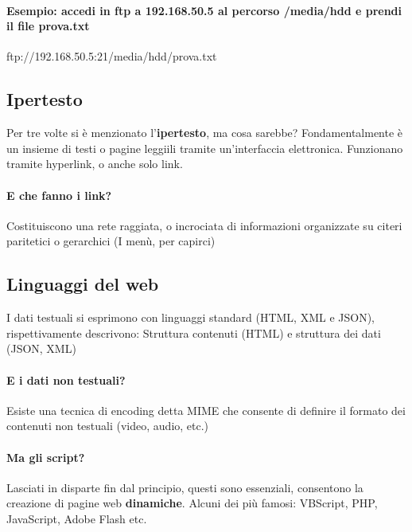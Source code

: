 \documentclass[12pt, a4paper, openany, twoside]{book}
\begin{document}
\paragraph{Esempio: accedi in ftp a 192.168.50.5 al percorso /media/hdd e 
prendi il file prova.txt} ftp://192.168.50.5:21/media/hdd/prova.txt
\subsection{Ipertesto}
Per tre volte si è menzionato l'\textbf{ipertesto}, ma cosa sarebbe? Fondamentalmente
è un insieme di testi o pagine leggiili tramite un'interfaccia elettronica. 
Funzionano tramite hyperlink, o anche solo link.
\paragraph{E che fanno i link?} Costituiscono una rete raggiata, o incrociata di
informazioni organizzate su citeri paritetici o gerarchici (I menù, per capirci)
\subsection{Linguaggi del web}
I dati testuali si esprimono con linguaggi standard (HTML, XML e JSON),
rispettivamente descrivono: Struttura contenuti (HTML) e struttura dei dati (JSON, XML)
\paragraph{E i dati non testuali?} Esiste una tecnica di encoding detta MIME che
consente di definire il formato dei contenuti non testuali (video, audio, etc.)
\paragraph{Ma gli script?} Lasciati in disparte fin dal principio, questi 
sono essenziali, consentono la creazione di pagine web \textbf{dinamiche}.
Alcuni dei più famosi: VBScript, PHP, JavaScript, Adobe Flash etc.




















    
\end{document}
